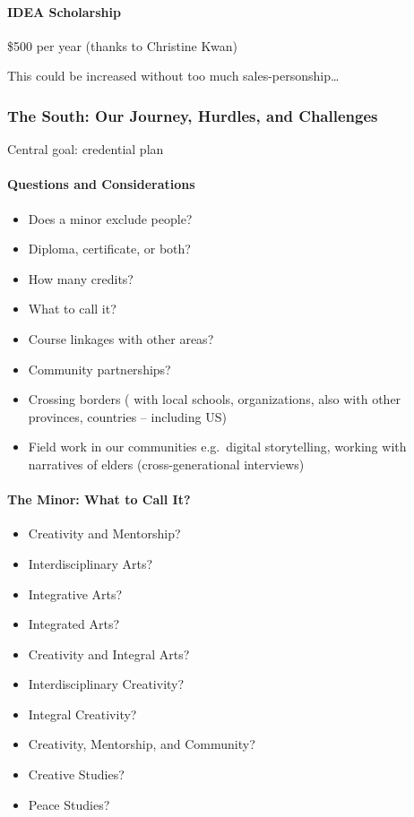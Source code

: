 \documentclass[letterpaper,10pt,headsepline]{scrreprt}
\begin{document}
\paragraph{IDEA Scholarship}

\$500 per year (thanks to Christine Kwan)

This could be increased without too much sales-personship\ldots{}

\subsubsection{The South: Our Journey, Hurdles, and Challenges}

Central goal: credential plan

\paragraph{Questions and Considerations}

\begin{itemize}
\itemsep1pt\parskip0pt
\item
  Does a minor exclude people?
\item
  Diploma, certificate, or both?
\item
  How many credits?
\item
  What to call it?
\item
  Course linkages with other areas?
\item
  Community partnerships?
\item
  Crossing borders ( with local schools, organizations, also with other
  provinces, countries -- including US)
\item
  Field work in our communities e.g.~digital storytelling, working with
  narratives of elders (cross-generational interviews)
\end{itemize}

\paragraph{The Minor: What to Call It?}

\begin{itemize}
\itemsep1pt\parskip0pt
\item
  Creativity and Mentorship?
\item
  Interdisciplinary Arts?
\item
  Integrative Arts?
\item
  Integrated Arts?
\item
  Creativity and Integral Arts?
\item
  Interdisciplinary Creativity?
\item
  Integral Creativity?
\item
  Creativity, Mentorship, and Community?
\item
  Creative Studies?
\item
  Peace Studies?
\end{itemize}
\end{document}
